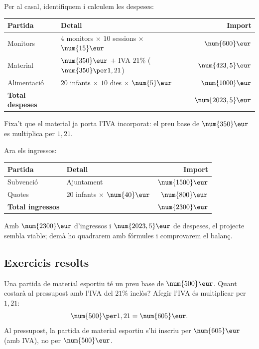 \begin{exemple}
Per al casal, identifiquem i calculem les despeses:
\begin{center}
\renewcommand{\arraystretch}{1.25}
\begin{tabular}{l l r}
\toprule
\textbf{Partida} & \textbf{Detall} & \textbf{Import} \\
\midrule
Monitors & $4$ monitors $\times$ $10$ sessions $\times$ $\num{15}\eur$ & $\num{600}\eur$ \\
Material & $\num{350}\eur$ $+$ IVA $21\%$ ($\num{350}\per 1,21$) & $\num{423,5}\eur$ \\
Alimentació & $20$ infants $\times$ $10$ dies $\times$ $\num{5}\eur$ & $\num{1000}\eur$ \\
\midrule
\textbf{Total despeses} & & $\num{2023,5}\eur$ \\
\bottomrule
\end{tabular}
\end{center}
Fixa't que el material ja porta l'IVA incorporat: el preu base de $\num{350}\eur$ es
multiplica per $1,21$.
\end{exemple}

\begin{exemple}
Ara els ingressos:
\begin{center}
\renewcommand{\arraystretch}{1.25}
\begin{tabular}{l l r}
\toprule
\textbf{Partida} & \textbf{Detall} & \textbf{Import} \\
\midrule
Subvenció & Ajuntament & $\num{1500}\eur$ \\
Quotes & $20$ infants $\times$ $\num{40}\eur$ & $\num{800}\eur$ \\
\midrule
\textbf{Total ingressos} & & $\num{2300}\eur$ \\
\bottomrule
\end{tabular}
\end{center}
Amb $\num{2300}\eur$ d'ingressos i $\num{2023,5}\eur$ de despeses, el projecte sembla
viable; demà ho quadrarem amb fórmules i comprovarem el balanç.
\end{exemple}

\subsection{Exercicis resolts}

\begin{exresolt}
Una partida de material esportiu té un preu base de $\num{500}\eur$. Quant costarà al
pressupost amb l'IVA del $21\%$ inclòs?
\solucio
Afegir l'IVA és multiplicar per $1,21$:
\[
\num{500}\per 1,21=\num{605}\eur.
\]
Al pressupost, la partida de material esportiu s'hi inscriu per $\num{605}\eur$ (amb
IVA), no per $\num{500}\eur$.
\end{exresolt}


